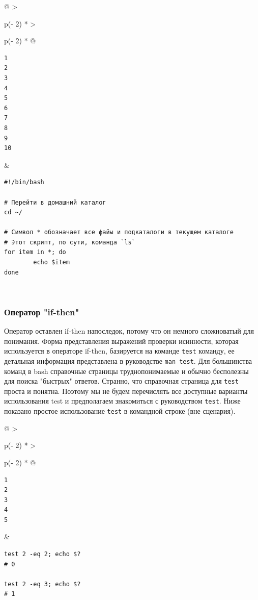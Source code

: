 \documentclass{article}
\begin{document}
\begin{longtable}[]{@{}
  >{\raggedright\arraybackslash}p{(\columnwidth - 2\tabcolsep) * }
  >{\raggedright\arraybackslash}p{(\columnwidth - 2\tabcolsep) * }@{}}
\toprule
\endhead
\begin{minipage}[t]{\linewidth}\raggedright
\begin{verbatim}
1
2
3
4
5
6
7
8
9
10
\end{verbatim}
\end{minipage} & \begin{minipage}[t]{\linewidth}\raggedright
\begin{verbatim}
#!/bin/bash

# Перейти в домашний каталог
cd ~/

# Символ * обозначает все файы и подкаталоги в текущем каталоге
# Этот скрипт, по сути, команда `ls`
for item in *; do
        echo $item
done
\end{verbatim}
\end{minipage} \\ \addlinespace
\bottomrule
\end{longtable}

\hypertarget{if-then-statements}{%
\subsubsection{\texorpdfstring{\protect\hyperlink{if-then-statements}{}Оператор
"if-then"}{Оператор "if-then"}}\label{if-then-statements}}

Оператор оставлен if-then напоследок, потому что он немного сложноватый
для понимания. Форма представления выражений проверки исинности, которая
используется в операторе if-then, базируется на команде \texttt{test}
команду, ее детальная информация представлена в руководстве
\texttt{man\ test}. Для большинства команд в bash справочные страницы
труднопонимаемые и обычно бесполезны для поиска "быстрых" ответов.
Странно, что справочная страница для \texttt{test} проста и понятна.
Поэтому мы не будем перечислять все доступные варианты использования
test и предполагаем знакомиться с руководством \texttt{test}. Ниже
показано простое использование \texttt{test} в командной строке (вне
сценария).

\begin{longtable}[]{@{}
  >{\raggedright\arraybackslash}p{(\columnwidth - 2\tabcolsep) * }
  >{\raggedright\arraybackslash}p{(\columnwidth - 2\tabcolsep) * }@{}}
\toprule
\endhead
\begin{minipage}[t]{\linewidth}\raggedright
\begin{verbatim}
1
2
3
4
5
\end{verbatim}
\end{minipage} & \begin{minipage}[t]{\linewidth}\raggedright
\begin{verbatim}
test 2 -eq 2; echo $?
# 0

test 2 -eq 3; echo $?
# 1
\end{verbatim}
\end{minipage} \\ \addlinespace
\bottomrule
\end{longtable}
\end{document}
